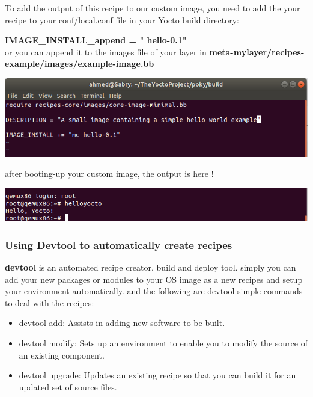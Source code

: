 \documentclass{article}
\begin{document}
To add the output of this recipe to our custom image, you need to add the your recipe to your conf/local.conf file in your Yocto build directory:

\textbf{IMAGE\_INSTALL\_append = " hello-0.1"}\\

or you can append it to the images file of your layer in \textbf{meta-mylayer/recipes-example/images/example-image.bb}

\begin{center}
  \includegraphics[scale=0.60]{./resources/img/add-hello-to-image-recipe.png}
\end{center}

after booting-up your custom image,  the output is here !
\begin{center}
  \includegraphics[scale=0.60]{./resources/img/hello-yocto-recipe.png}
\end{center}

\subsubsection{Using Devtool to automatically create recipes}
\textbf{devtool} is an automated recipe creator, build and deploy tool. simply you can add your new packages or modules to your OS image as a new recipes and setup your environment automatically. and the following are devtool simple commands to deal with the recipes:

\begin{itemize}
\item devtool add: Assists in adding new software to be built.
\item devtool modify: Sets up an environment to enable you to modify the source of an existing component.
\item devtool upgrade: Updates an existing recipe so that you can build it for an updated set of source files.
\end{itemize}
\end{document}
